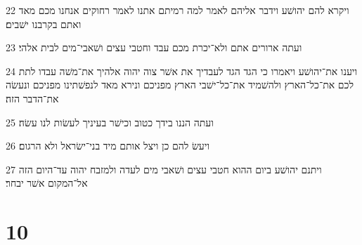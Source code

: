 \par 22 ויקרא להם יהושׁע וידבר אליהם לאמר למה רמיתם אתנו לאמר רחוקים אנחנו מכם מאד ואתם בקרבנו ישׁבים׃
\par 23 ועתה ארורים אתם ולא־יכרת מכם עבד וחטבי עצים ושׁאבי־מים לבית אלהי׃
\par 24 ויענו את־יהושׁע ויאמרו כי הגד הגד לעבדיך את אשׁר צוה יהוה אלהיך את־משׁה עבדו לתת לכם את־כל־הארץ ולהשׁמיד את־כל־ישׁבי הארץ מפניכם ונירא מאד לנפשׁתינו מפניכם ונעשׂה את־הדבר הזה׃
\par 25 ועתה הננו בידך כטוב וכישׁר בעיניך לעשׂות לנו עשׂה׃
\par 26 ויעשׂ להם כן ויצל אותם מיד בני־ישׂראל ולא הרגום׃
\par 27 ויתנם יהושׁע ביום ההוא חטבי עצים ושׁאבי מים לעדה ולמזבח יהוה עד־היום הזה אל־המקום אשׁר יבחר׃

\chapter{10}

